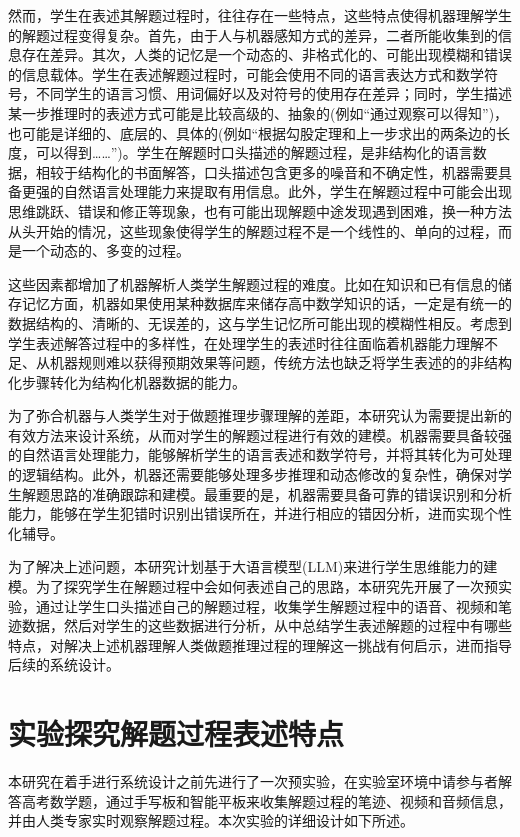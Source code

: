 然而，学生在表述其解题过程时，往往存在一些特点，这些特点使得机器理解学生的解题过程变得复杂。首先，由于人与机器感知方式的差异，二者所能收集到的信息存在差异。其次，人类的记忆是一个动态的、非格式化的、可能出现模糊和错误的信息载体。学生在表述解题过程时，可能会使用不同的语言表达方式和数学符号，不同学生的语言习惯、用词偏好以及对符号的使用存在差异；同时，学生描述某一步推理时的表述方式可能是比较高级的、抽象的(例如“通过观察可以得知”)，也可能是详细的、底层的、具体的(例如“根据勾股定理和上一步求出的两条边的长度，可以得到……”)。学生在解题时口头描述的解题过程，是非结构化的语言数据，相较于结构化的书面解答，口头描述包含更多的噪音和不确定性，机器需要具备更强的自然语言处理能力来提取有用信息。此外，学生在解题过程中可能会出现思维跳跃、错误和修正等现象，也有可能出现解题中途发现遇到困难，换一种方法从头开始的情况，这些现象使得学生的解题过程不是一个线性的、单向的过程，而是一个动态的、多变的过程。

这些因素都增加了机器解析人类学生解题过程的难度。比如在知识和已有信息的储存记忆方面，机器如果使用某种数据库来储存高中数学知识的话，一定是有统一的数据结构的、清晰的、无误差的，这与学生记忆所可能出现的模糊性相反。考虑到学生表述解答过程中的多样性，在处理学生的表述时往往面临着机器能力理解不足、从机器规则难以获得预期效果等问题，传统方法也缺乏将学生表述的的非结构化步骤转化为结构化机器数据的能力。

为了弥合机器与人类学生对于做题推理步骤理解的差距，本研究认为需要提出新的有效方法来设计系统，从而对学生的解题过程进行有效的建模。机器需要具备较强的自然语言处理能力，能够解析学生的语言表述和数学符号，并将其转化为可处理的逻辑结构。此外，机器还需要能够处理多步推理和动态修改的复杂性，确保对学生解题思路的准确跟踪和建模。最重要的是，机器需要具备可靠的错误识别和分析能力，能够在学生犯错时识别出错误所在，并进行相应的错因分析，进而实现个性化辅导。

为了解决上述问题，本研究计划基于大语言模型(LLM)来进行学生思维能力的建模。为了探究学生在解题过程中会如何表述自己的思路，本研究先开展了一次预实验，通过让学生口头描述自己的解题过程，收集学生解题过程中的语音、视频和笔迹数据，然后对学生的这些数据进行分析，从中总结学生表述解题的过程中有哪些特点，对解决上述机器理解人类做题推理过程的理解这一挑战有何启示，进而指导后续的系统设计。

\section{实验探究解题过程表述特点}

本研究在着手进行系统设计之前先进行了一次预实验，在实验室环境中请参与者解答高考数学题，通过手写板和智能平板来收集解题过程的笔迹、视频和音频信息，并由人类专家实时观察解题过程。本次实验的详细设计如下所述。

